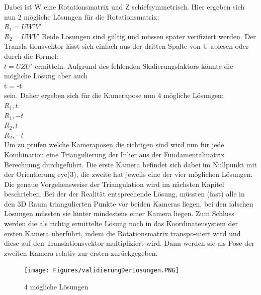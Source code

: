 Dabei ist W eine Rotationsmatrix und Z schiefsymmetrisch. Hier ergeben sich nun 2 mögliche Lösungen für die Rotationsmatrix:
\\
$R_1 = UW'V'$
\\
$R_2 = UWV'$
Beide Lösungen sind gültig und müssen später verifiziert werden. Der Transla-tionsvektor lässt sich einfach aus der dritten Spalte von U ablesen oder durch die Formel:
\\
$t = UZU'$
ermitteln. Aufgrund des fehlenden Skalierungsfaktors könnte die mögliche Lösung aber auch
\\
t = -t
\\
sein. Daher ergeben sich für die Kamerapose nun 4 mögliche Lösungen:
\\
$R_1, t$
\\
$R_1, -t$
\\
$R_2, t$
\\
$R_2, -t$
\\
Um zu prüfen welche Kameraposen die richtigen sind wird nun für jede Kombination eine Triangulierung der Inlier aus der Fundamentalmatrix Berechnung durchgeführt. Die erste Kamera befindet sich dabei im Nullpunkt mit der Orientierung eye(3), die zweite hat jeweils eine der vier möglichen Lösungen. Die genaue Vorgehensweise der Triangulation wird im nächsten Kapitel beschrieben. Bei der der Realität entsprechende Lösung, müssten (fast) alle in den 3D Raum triangulierten Punkte vor beiden Kameras liegen, bei den falschen Lösungen müssten sie hinter mindestens einer Kamera liegen. Zum Schluss werden die als richtig ermittelte Lösung noch in das Koordinatensystem der ersten Kamera überführt, indem die Rotationsmatrix transpo-niert wird und diese auf den Translationsvektor multipliziert wird. Dann werden sie als Pose der zweiten Kamera relativ zur ersten zurückgegeben. \cite{Richard2000} \cite{LTH2013}
\begin{figure}[ht]
    \centering
    \texttt{[image: Figures/validierungDerLosungen.PNG]}
    \caption{4 mögliche Lösungen \cite{LTH2013}}
\end{figure}

